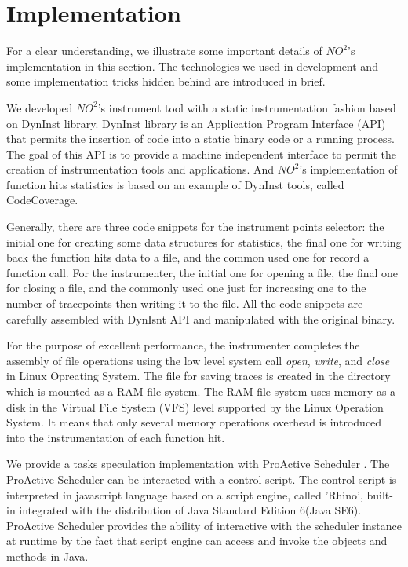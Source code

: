 \section{Implementation}

For a clear understanding, we illustrate some important details of $NO^2$'s implementation in this section. The technologies we used in development and some implementation tricks hidden behind are introduced in brief.

We developed $NO^2$'s instrument tool with a static instrumentation fashion based on DynInst \cite{Dyninst-Deconstruction} library. DynInst library is an Application Program Interface (API) \cite{dyninstapi} that permits the insertion of code into a static binary code or a running process. The goal of this API is to provide a machine independent interface to permit the creation of instrumentation tools and applications. And $NO^2$'s implementation of function hits statistics is based on an example of DynInst tools, called CodeCoverage.

Generally, there are three code snippets for the instrument points selector: the initial one for creating some data structures for statistics, the final one for writing back the function hits data to a file, and the common used one for record a function call. For the instrumenter, the initial one for opening a file, the final one for closing a file, and the commonly used one just for increasing one to the number of tracepoints then writing it to the file. All the code snippets are carefully assembled with DynIsnt API and manipulated with the original binary.

For the purpose of excellent performance, the instrumenter completes the assembly of file operations using the low level system call \emph{open}, \emph{write}, and \emph{close} in Linux Opreating System. The file for saving traces is created in the directory which is mounted as a RAM file system. The RAM file system uses memory as a disk in the Virtual File System (VFS) level supported by the Linux Operation System. It means that only several memory operations overhead is introduced into the instrumentation of each function hit.

We provide a tasks speculation implementation with ProActive Scheduler \cite{pascheduling}. The ProActive Scheduler can be interacted with a control script. The control script is interpreted in javascript language based on a script engine, called 'Rhino', built-in integrated with the distribution of Java Standard Edition 6(Java SE6). ProActive Scheduler provides the ability of interactive with the scheduler instance at runtime by the fact that script engine can access and invoke the objects and methods in Java.

